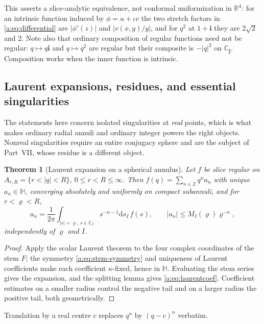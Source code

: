 \documentclass[11pt,a4paper]{article}
\numberwithin{equation}{section}
\newtheorem{theorem}{Theorem}[section]
\theoremstyle{definition}
\theoremstyle{remark}
\theoremstyle{plain}
\newcommand{\HH}{\mathbb H}
\newcommand{\RR}{\mathbb R}
\newcommand{\CC}{\mathbb C}
\newcommand{\ZZ}{\mathbb Z}
\newcommand{\abs}[1]{\lvert #1\rvert}
\newcommand{\dd}{\mathrm d}
\begin{document}
This asserts a slice-analytic equivalence, not conformal uniformization in
$\RR^4$: for an intrinsic function induced by $\phi=u+\iota v$ the two stretch
factors in \eqref{a:eq:differential} are $\abs{\phi'(z)}$ and
$\abs{v(x,y)/y}$, and for $q^2$ at $1+\mathbf i$ they are $2\sqrt2$ and $2$.
Note also that ordinary composition of regular functions need not be regular:
$q\mapsto q\mathbf i$ and $q\mapsto q^2$ are regular but their composite is
$-\abs q^2$ on $\CC_{\mathbf j}$. Composition works when the inner function is
intrinsic.

\subsection{Laurent expansions, residues, and essential singularities}
\label{a:sec:slice-laurent}

The statements here concern isolated singularities at \emph{real} points,
which is what makes ordinary radial annuli and ordinary integer powers the
right objects. Nonreal singularities require an entire conjugacy sphere and
are the subject of Part~VII, whose residue is a different object.

\begin{theorem}[Laurent expansion on a spherical annulus]
\label{a:thm:laurent}
Let $f$ be slice regular on $A_{r,R}=\{r<\abs q<R\}$, $0\le r<R\le\infty$.
Then $f(q)=\sum_{n\in\ZZ}q^na_n$ with unique $a_n\in\HH$, converging
absolutely and uniformly on compact subannuli, and for $r<\varrho<R$,
\begin{equation}
 a_n=\frac1{2\pi}\int_{\abs s=\varrho,\,s\in\CC_I}s^{-n-1}\dd s_I\,f(s),
 \qquad \abs{a_n}\le M_I(\varrho)\varrho^{-n},
 \label{a:eq:laurentcoef}
\end{equation}
independently of $\varrho$ and $I$.
\end{theorem}

\begin{proof}
Apply the scalar Laurent theorem to the four complex coordinates of the stem
$F$; the symmetry \eqref{a:eq:stem-symmetry} and uniqueness of Laurent
coefficients make each coefficient $\kappa$-fixed, hence in $\HH$. Evaluating
the stem series gives the expansion, and the splitting lemma gives
\eqref{a:eq:laurentcoef}. Coefficient estimates on a smaller radius control
the negative tail and on a larger radius the positive tail, both
geometrically.
\end{proof}

Translation by a real centre $c$ replaces $q^n$ by $(q-c)^n$ verbatim.
\end{document}
